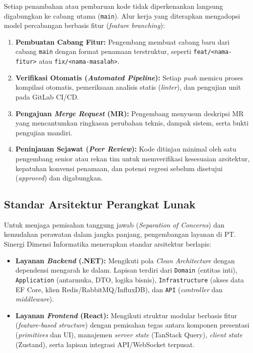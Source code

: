 Setiap penambahan atau pembaruan kode tidak diperkenankan langsung digabungkan ke cabang utama (\texttt{main}). Alur kerja yang diterapkan mengadopsi model percabangan berbasis fitur (\textit{feature branching}):

\begin{enumerate}[label=\arabic*., leftmargin=*, itemsep=0pt]
  \item \textbf{Pembuatan Cabang Fitur:} Pengembang membuat cabang baru dari cabang \texttt{main} dengan format penamaan terstruktur, seperti \texttt{feat/<nama-fitur>} atau \texttt{fix/<nama-masalah>}.
  \item \textbf{Verifikasi Otomatis (\textit{Automated Pipeline}):} Setiap \textit{push} memicu proses kompilasi otomatis, pemeriksaan analisis statis (\textit{linter}), dan pengujian unit pada GitLab CI/CD.
  \item \textbf{Pengajuan \textit{Merge Request} (MR):} Pengembang menyusun deskripsi MR yang mencantumkan ringkasan perubahan teknis, dampak sistem, serta bukti pengujian mandiri.
  \item \textbf{Peninjauan Sejawat (\textit{Peer Review}):} Kode ditinjau minimal oleh satu pengembang senior atau rekan tim untuk memverifikasi kesesuaian arsitektur, kepatuhan konvensi penamaan, dan potensi regresi sebelum disetujui (\textit{approved}) dan digabungkan.
\end{enumerate}

\subsection{Standar Arsitektur Perangkat Lunak}

Untuk menjaga pemisahan tanggung jawab (\textit{Separation of Concerns}) dan kemudahan perawatan dalam jangka panjang, pengembangan layanan di PT. Sinergi Dimensi Informatika menerapkan standar arsitektur berlapis:

\begin{itemize}[leftmargin=*, itemsep=0pt]
  \item \textbf{Layanan \textit{Backend} (.NET):} Mengikuti pola \textit{Clean Architecture} dengan dependensi mengarah ke dalam. Lapisan terdiri dari \texttt{Domain} (entitas inti), \texttt{Application} (antarmuka, DTO, logika bisnis), \texttt{Infrastructure} (akses data EF Core, klien Redis/RabbitMQ/InfluxDB), dan \texttt{API} (\textit{controller} dan \textit{middleware}).
  \item \textbf{Layanan \textit{Frontend} (React):} Mengikuti struktur modular berbasis fitur (\textit{feature-based structure}) dengan pemisahan tegas antara komponen presentasi (\textit{primitives} dan UI), manajemen \textit{server state} (TanStack Query), \textit{client state} (Zustand), serta lapisan integrasi API/WebSocket terpusat.
\end{itemize}


